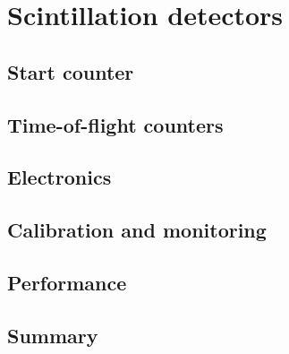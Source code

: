 \section[Scintillation detectors (Mark I./Beni)]{Scintillation detectors \label{sec:scintillators}}
\subsection{Start counter \label{sec:st}}
\subsection[Time-of-flight counters (Beni)]{Time-of-flight counters \label{sec:tof}}
\subsection{Electronics \label{sec:scelectronics}}
\subsection{Calibration and monitoring \label{sec:sccalib}}
\subsection{Performance \label{sec:scperformance}}
\subsection{Summary \label{sec:scsummary}}
